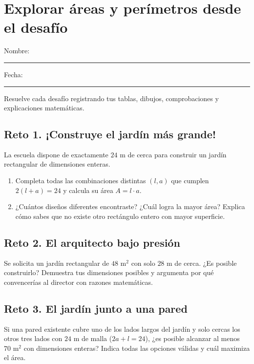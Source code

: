 \documentclass[spanish,letterpaper,oneside]{article}
\begin{document}
\templatePortrait\templatePagecfg\templateFinalcfg\fancyfoot{}\fancyfoot[C]{\scriptsize\thepage}\raggedbottom

\section*{Explorar áreas y perímetros desde el desafío}
Nombre: \rule{8cm}{.2pt}\hfill Fecha: \rule{2.5cm}{.2pt}

Resuelve cada desafío registrando tus tablas, dibujos, comprobaciones y explicaciones matemáticas.

\subsection*{Reto 1. ¡Construye el jardín más grande!}
La escuela dispone de exactamente $24\text{ m}$ de cerca para construir un jardín rectangular de dimensiones enteras.
\begin{enumerate}
  \item Completa todas las combinaciones distintas $(l, a)$ que cumplen $2(l+a)=24$ y calcula su área $A=l\cdot a$.
  \item ¿Cuántos diseños diferentes encontraste? ¿Cuál logra la mayor área? Explica cómo sabes que no existe otro rectángulo entero con mayor superficie.
\end{enumerate}
\vspace{2.0cm}

\subsection*{Reto 2. El arquitecto bajo presión}
Se solicita un jardín rectangular de $48\text{ m}^2$ con solo $28\text{ m}$ de cerca. ¿Es posible construirlo? Demuestra tus dimensiones posibles y argumenta por qué convencerías al director con razones matemáticas.
\vspace{2.0cm}

\subsection*{Reto 3. El jardín junto a una pared}
Si una pared existente cubre uno de los lados largos del jardín y solo cercas los otros tres lados con $24\text{ m}$ de malla ($2a+l=24$), ¿es posible alcanzar al menos $70\text{ m}^2$ con dimensiones enteras? Indica todas las opciones válidas y cuál maximiza el área.
\vspace{2.0cm}
\end{document}

